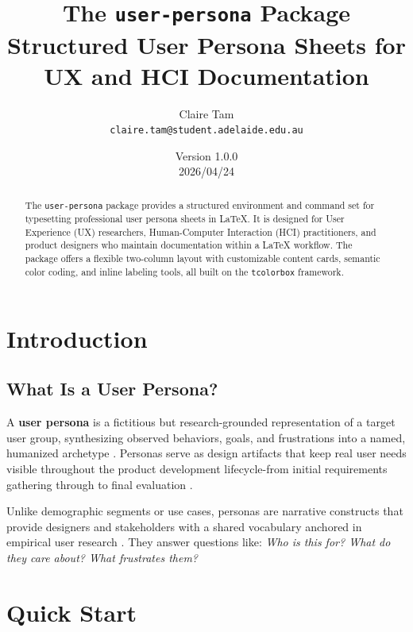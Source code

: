 \documentclass[a4paper,11pt]{article}
\title{The \texttt{user-persona} Package\\
  \large Structured User Persona Sheets for UX and HCI Documentation}
\author{Claire Tam\\
  \texttt{claire.tam@student.adelaide.edu.au}}
\date{Version 1.0.0\\2026/04/24}
\begin{document}
\maketitle

\begin{abstract}
The \texttt{user-persona} package provides a structured environment and command set for typesetting professional user persona sheets in \LaTeX{}. It is designed for User Experience (UX) researchers, Human-Computer Interaction (HCI) practitioners, and product designers who maintain documentation within a \LaTeX{} workflow. The package offers a flexible two-column layout with customizable content cards, semantic color coding, and inline labeling tools, all built on the \texttt{tcolorbox} framework.
\end{abstract}

\tableofcontents

\section{Introduction}

\subsection{What Is a User Persona?}

A \textbf{user persona} is a fictitious but research-grounded representation of a target user group, synthesizing observed behaviors, goals, and frustrations into a named, humanized archetype \cite{cooper1999}. Personas serve as design artifacts that keep real user needs visible throughout the product development lifecycle-from initial requirements gathering through to final evaluation \cite{pruitt2006}.

Unlike demographic segments or use cases, personas are narrative constructs that provide designers and stakeholders with a shared vocabulary anchored in empirical user research \cite{nielsen2019}. They answer questions like: \textit{Who is this for? What do they care about? What frustrates them?}


\section{Quick Start}
\end{document}
